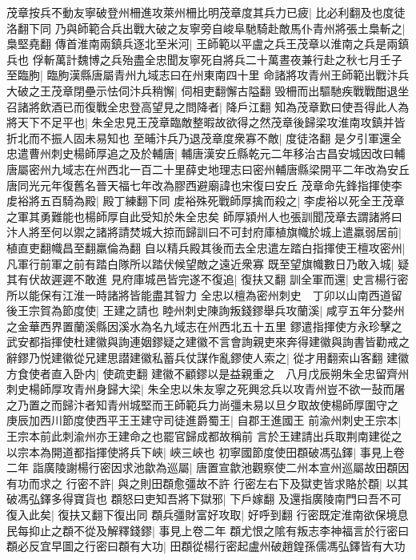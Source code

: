 茂章按兵不動友寧破登州柵進攻萊州柵比明茂章度其兵力已疲|{
	比必利翻及也度徒洛翻下同}
乃與師範合兵出戰大破之友寧旁自峻阜馳騎赴敵馬仆青州將張土梟斬之|{
	梟堅堯翻}
傳首淮南兩鎮兵逐北至米河|{
	王師範以平盧之兵王茂章以淮南之兵是兩鎮兵也}
俘斬萬計魏博之兵殆盡全忠聞友寧死自將兵二十萬晝夜兼行赴之秋七月壬子至臨胊|{
	臨朐漢縣唐屬青州九域志曰在州東南四十里}
命諸將攻青州王師範出戰汴兵大破之王茂章閉壘示怯伺汴兵稍懈|{
	伺相吏翻懈古隘翻}
毁柵而出驅馳疾戰戰酣退坐召諸將飲酒已而復戰全忠登高望見之問降者|{
	降戶江翻}
知為茂章歎曰使吾得此人為將天下不足平也|{
	朱全忠見王茂章臨敵整暇故欲得之然茂章後歸梁攻淮南攻鎮并皆折北而不振人固未易知也}
至晡汴兵乃退茂章度衆寡不敵|{
	度徒洛翻}
是夕引軍還全忠遣曹州刺史楊師厚追之及於輔唐|{
	輔唐漢安丘縣乾元二年移治古昌安城因改曰輔唐屬密州九域志在州西北一百二十里薛史地理志曰密州輔唐縣梁開平二年改為安丘唐同光元年復舊名晉天福七年改為膠西避廟諱也宋復曰安丘}
茂章命先鋒指揮使李䖍裕將五百騎為殿|{
	殿丁練翻下同}
䖍裕殊死戰師厚擒而殺之|{
	李䖍裕以死全王茂章之軍其勇難能也楊師厚自此受知於朱全忠矣}
師厚潁州人也張訓聞茂章去謂諸將曰汴人將至何以禦之諸將請焚城大掠而歸訓曰不可封府庫植旗幟於城上遣羸弱居前|{
	植直吏翻幟昌至翻羸倫為翻}
自以精兵殿其後而去全忠遣左踏白指揮使王檀攻密州|{
	凡軍行前軍之前有踏白隊所以踏伏候望敵之遠近衆寡}
既至望旗幟數日乃敢入城|{
	疑其有伏故遲遲不敢進}
見府庫城邑皆完遂不復追|{
	復扶又翻}
訓全軍而還|{
	史言楊行密所以能保有江淮一時諸將皆能盡其智力}
全忠以檀為密州刺史　丁卯以山南西道留後王宗賀為節度使|{
	王建之請也}
睦州刺史陳詢叛錢鏐舉兵攻蘭溪|{
	咸亨五年分婺州之金華西界置蘭溪縣因溪水為名九域志在州西北五十五里}
鏐遣指揮使方永珍擊之武安都指揮使杜建徽與詢連姻鏐疑之建徽不言會詢親吏來奔得建徽與詢書皆勸戒之辭鏐乃悦建徽從兄建思譛建徽私蓄兵仗謀作亂鏐使人索之|{
	從才用翻索山客翻}
建徽方食使者直入卧内|{
	使疏吏翻}
建徽不顧鏐以是益親重之　八月戊辰朔朱全忠留齊州刺史楊師厚攻青州身歸大梁|{
	朱全忠以朱友寧之死興忿兵以攻青州豈不欲一鼔而屠之乃置之而歸汴者知青州城堅而王師範兵力尚彊未易以旦夕取故使楊師厚圍守之}
庚辰加西川節度使西平王王建守司徒進爵蜀王|{
	自郡王進國王}
前渝州刺史王宗本|{
	王宗本前此刺渝州亦王建命之也罷官歸成都故稱前}
言於王建請出兵取荆南建從之以宗本為開道都指揮使將兵下峽|{
	峽三峽也}
初寧國節度使田頵破馮弘鐸|{
	事見上卷二年}
詣廣陵謝楊行密因求池歙為巡屬|{
	唐置宣歙池觀察使二州本宣州巡屬故田頵因有功而求之}
行密不許|{
	與之則田頵愈彊故不許}
行密左右下及獄吏皆求賂於頵|{
	以其破馮弘鐸多得寶貨也}
頵怒曰吏知吾將下獄邪|{
	下戶嫁翻}
及還指廣陵南門曰吾不可復入此矣|{
	復扶又翻下復出同}
頵兵彊財富好攻取|{
	好呼到翻}
行密既定淮南欲保境息民每抑止之頵不從及解釋錢鏐|{
	事見上卷二年}
頵尤恨之隂有叛志李神福言於行密曰頵必反宜早圖之行密曰頵有大功|{
	田頵從楊行密起盧州破趙鍠孫儒馮弘鐸皆有大功}
